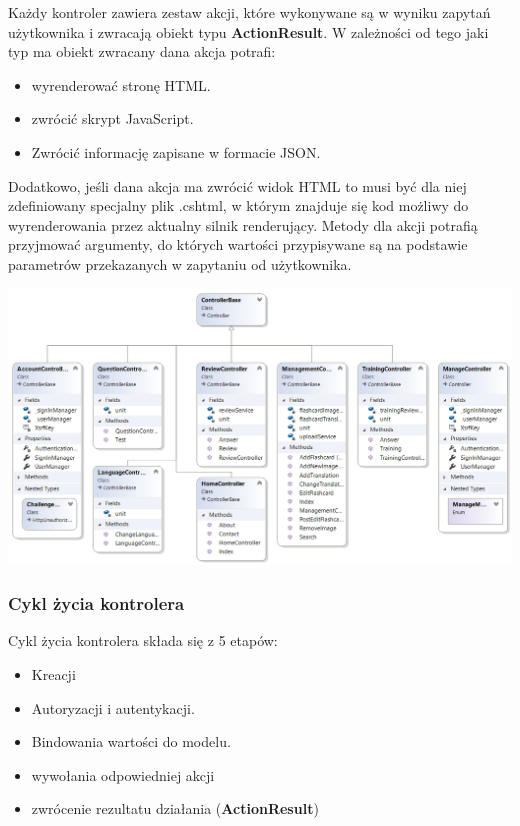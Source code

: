 Każdy kontroler zawiera zestaw akcji, które wykonywane są w wyniku zapytań użytkownika i zwracają obiekt typu \textbf{ActionResult}. W zależności od tego jaki typ ma obiekt zwracany dana akcja potrafi:

\begin{itemize}
	\item wyrenderować stronę HTML.
	\item zwrócić skrypt JavaScript.
	\item Zwrócić informację zapisane w formacie JSON.
\end{itemize}

Dodatkowo, jeśli dana akcja ma zwrócić widok HTML to musi być dla niej zdefiniowany specjalny plik .cshtml, w którym znajduje się kod możliwy do wyrenderowania przez aktualny silnik renderujący. 
Metody dla akcji potrafią przyjmować argumenty, do których wartości przypisywane są na podstawie parametrów przekazanych w zapytaniu od użytkownika. 
\begin{landscape}
\begin{center}
	\includegraphics[width=\paperwidth + 2.5cm]{images/Controllers.png}
\end{center}
\end{landscape}

\subsubsection{Cykl życia kontrolera}

Cykl życia kontrolera składa się z 5 etapów:
\begin{itemize}
	\item Kreacji
	\item Autoryzacji i autentykacji.
	\item Bindowania wartości do modelu.
	\item wywołania odpowiedniej akcji
	\item zwrócenie rezultatu działania (\textbf{ActionResult})
\end{itemize}

